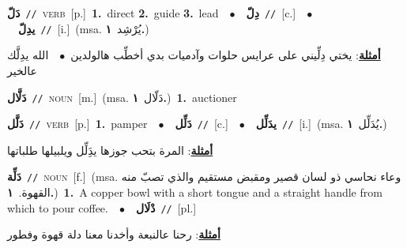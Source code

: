 \documentclass[10pt,a4paper,twoside]{article} %
\begin{document}
\begin{multicols}{2}
{\setlength\topsep{0pt}\textbf{\foreignlanguage{arabic}{دَلّ}}\ {\color{gray}\texttt{//}\color{black}}\ \textsc{verb}\ [p.]\ \textbf{1.}~direct  \textbf{2.}~guide  \textbf{3.}~lead\ \ $\bullet$\ \ \setlength\topsep{0pt}\textbf{\foreignlanguage{arabic}{دِلّ}}\ {\color{gray}\texttt{//}\color{black}}\ [c.]\ \ $\bullet$\ \ \setlength\topsep{0pt}\textbf{\foreignlanguage{arabic}{يدِلّ}}\ {\color{gray}\texttt{//}\color{black}}\ [i.]\ \color{gray}(msa. \foreignlanguage{arabic}{يُرْشِد}~\foreignlanguage{arabic}{\textbf{١.}})\color{black}\  \begin{flushright}\color{gray}\foreignlanguage{arabic}{\textbf{\underline{\foreignlanguage{arabic}{أمثلة}}}: يختي دِلِّيني على عرايس حلوات وآدميات بدي أخطِّب هالولدين\ $\bullet$\ \  الله يدِلَّك عالخير}\end{flushright}\color{black}} \vspace{2mm}

{\setlength\topsep{0pt}\textbf{\foreignlanguage{arabic}{دَلَّال}}\ {\color{gray}\texttt{//}\color{black}}\ \textsc{noun}\ [m.]\ \color{gray}(msa. \foreignlanguage{arabic}{دَلّال}~\foreignlanguage{arabic}{\textbf{١.}})\color{black}\ \textbf{1.}~auctioner\ } \vspace{2mm}

{\setlength\topsep{0pt}\textbf{\foreignlanguage{arabic}{دَلَّل}}\ {\color{gray}\texttt{//}\color{black}}\ \textsc{verb}\ [p.]\ \textbf{1.}~pamper\ \ $\bullet$\ \ \setlength\topsep{0pt}\textbf{\foreignlanguage{arabic}{دَلِّل}}\ {\color{gray}\texttt{//}\color{black}}\ [c.]\ \ $\bullet$\ \ \setlength\topsep{0pt}\textbf{\foreignlanguage{arabic}{يدَلِّل}}\ {\color{gray}\texttt{//}\color{black}}\ [i.]\ \color{gray}(msa. \foreignlanguage{arabic}{يُدَلِّل}~\foreignlanguage{arabic}{\textbf{١.}})\color{black}\  \begin{flushright}\color{gray}\foreignlanguage{arabic}{\textbf{\underline{\foreignlanguage{arabic}{أمثلة}}}: المرة بتحب جوزها يدَِلِّل ويلبيلها طلباتها}\end{flushright}\color{black}} \vspace{2mm}

{\setlength\topsep{0pt}\textbf{\foreignlanguage{arabic}{دَلِّة}}\ {\color{gray}\texttt{//}\color{black}}\ \textsc{noun}\ [f.]\ \color{gray}(msa. \foreignlanguage{arabic}{وعاء نحاسي ذو لسان قصير ومقبض مستقيم والذي تصبّ منه القهوة.}~\foreignlanguage{arabic}{\textbf{١.}})\color{black}\ \textbf{1.}~A copper bowl with a short tongue and a straight handle from which to pour coffee.\ \ $\bullet$\ \ \setlength\topsep{0pt}\textbf{\foreignlanguage{arabic}{دْلَال}}\ {\color{gray}\texttt{//}\color{black}}\ [pl.]\  \begin{flushright}\color{gray}\foreignlanguage{arabic}{\textbf{\underline{\foreignlanguage{arabic}{أمثلة}}}: رحنا عالنبعة وأخدنا معنا دلة قهوة وفطور}\end{flushright}\color{black}} \vspace{2mm}


\end{multicols}
\end{document}
